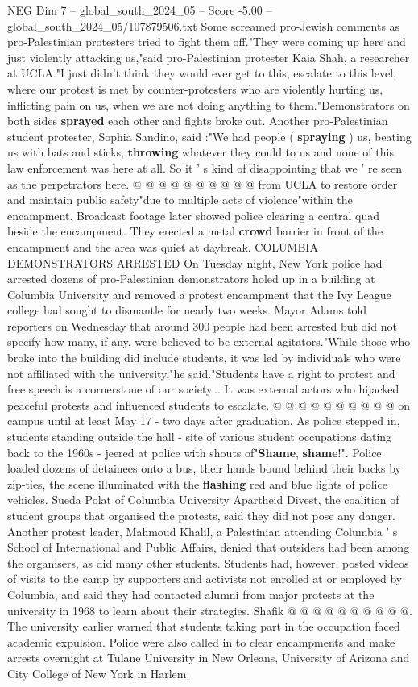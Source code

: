 \begin{textsample}{NEG Dim 7 – global\_south\_2024\_05 – Score -5.00 – global\_south\_2024\_05/107879506.txt}
Some screamed pro-Jewish comments as pro-Palestinian protesters tried to fight them off."They were coming up here and just violently attacking us,"said pro-Palestinian protester Kaia Shah, a researcher at UCLA."I just didn't think they would ever get to this, escalate to this level, where our protest is met by counter-protesters who are violently hurting us, inflicting pain on us, when we are not doing anything to them."Demonstrators on both sides \textbf{sprayed} each other and fights broke out.
Another pro-Palestinian student protester, Sophia Sandino, said :"We had people ( \textbf{spraying} ) us, beating us with bats and sticks, \textbf{throwing} whatever they could to us and none of this law enforcement was here at all.
So it ' s kind of disappointing that we ' re seen as the perpetrators here. @ @ @ @ @ @ @ @ @ @ from UCLA to restore order and maintain public safety"due to multiple acts of violence"within the encampment.
Broadcast footage later showed police clearing a central quad beside the encampment.
They erected a metal \textbf{crowd} barrier in front of the encampment and the area was quiet at daybreak.
COLUMBIA DEMONSTRATORS ARRESTED On Tuesday night, New York police had arrested dozens of pro-Palestinian demonstrators holed up in a building at Columbia University and removed a protest encampment that the Ivy League college had sought to dismantle for nearly two weeks.
Mayor Adams told reporters on Wednesday that around 300 people had been arrested but did not specify how many, if any, were believed to be external agitators."While those who broke into the building did include students, it was led by individuals who were not affiliated with the university,"he said."Students have a right to protest and free speech is a cornerstone of our society...
It was external actors who hijacked peaceful protests and influenced students to escalate. @ @ @ @ @ @ @ @ @ @ on campus until at least May 17 - two days after graduation.
As police stepped in, students standing outside the hall - site of various student occupations dating back to the 1960s - jeered at police with shouts of"\textbf{Shame}, \textbf{shame}!".
Police loaded dozens of detainees onto a bus, their hands bound behind their backs by zip-ties, the scene illuminated with the \textbf{flashing} red and blue lights of police vehicles.
Sueda Polat of Columbia University Apartheid Divest, the coalition of student groups that organised the protests, said they did not pose any danger.
Another protest leader, Mahmoud Khalil, a Palestinian attending Columbia ' s School of International and Public Affairs, denied that outsiders had been among the organisers, as did many other students.
Students had, however, posted videos of visits to the camp by supporters and activists not enrolled at or employed by Columbia, and said they had contacted alumni from major protests at the university in 1968 to learn about their strategies.
Shafik @ @ @ @ @ @ @ @ @ @.
The university earlier warned that students taking part in the occupation faced academic expulsion.
Police were also called in to clear encampments and make arrests overnight at Tulane University in New Orleans, University of Arizona and City College of New York in Harlem.


\end{textsample}
